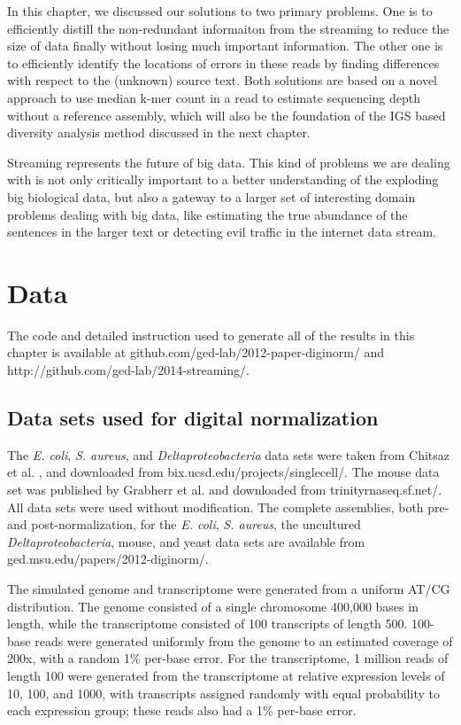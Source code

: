  In this chapter, we discussed our solutions to
two primary problems. One is to efficiently distill the non-redundant informaiton
from the streaming to reduce the size of data finally without losing much important 
information. The other one is to
efficiently identify the locations of errors in these reads by
finding differences with respect to the (unknown) source text. Both solutions 
are based on a novel approach to use median k-mer count in a read to estimate
sequencing depth without a reference assembly, which will also be the foundation
of the IGS based diversity analysis method discussed in the next chapter.

Streaming represents the future of big data. 
This kind of problems we are dealing with is not only critically important to 
a better understanding of the exploding big biological data, but also a 
gateway to a larger set of interesting domain problems
dealing with big data, like estimating the true abundance of the 
sentences in the larger text or detecting evil traffic in the internet data
stream.






\section{Data}

The code and detailed instruction used to generate all of the results in this chapter is available at
github.com/ged-lab/2012-paper-diginorm/ and 
http://github.com/ged-lab/2014-streaming/. 

\subsection{Data sets used for digital normalization}

The {\em E. coli}, {\em S. aureus}, and {\em Deltaproteobacteria} data sets
were taken from Chitsaz et al. \cite{pubmed21926975}, and downloaded from
bix.ucsd.edu/projects/singlecell/.  The mouse data set was published by
Grabherr et al. \cite{pubmed21572440} and downloaded from
trinityrnaseq.sf.net/.  All data sets were used without modification. The
complete assemblies, both pre- and post-normalization, for the {\em E. coli},
{\em S. aureus}, the uncultured {\em Deltaproteobacteria}, mouse, and yeast
data sets are available from ged.msu.edu/papers/2012-diginorm/.

The simulated genome and transcriptome were generated from a uniform AT/CG
distribution.  The genome consisted of a single chromosome 400,000 bases in
length, while the transcriptome consisted of 100 transcripts of length 500.
100-base reads were generated uniformly from the genome to an estimated
coverage of 200x, with a random 1\% per-base error.  For the transcriptome, 1
million reads of length 100 were generated from the transcriptome at relative
expression levels of 10, 100, and 1000, with transcripts assigned randomly with
equal probability to each expression group; these reads also had a 1\% per-base
error.


